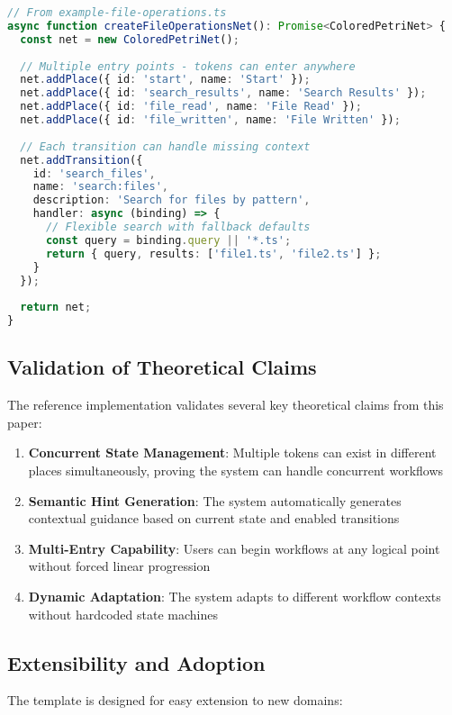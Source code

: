 \documentclass[11pt,a4paper]{article}
\begin{document}
\begin{lstlisting}[language=TypeScript]
// From example-file-operations.ts
async function createFileOperationsNet(): Promise<ColoredPetriNet> {
  const net = new ColoredPetriNet();
  
  // Multiple entry points - tokens can enter anywhere
  net.addPlace({ id: 'start', name: 'Start' });
  net.addPlace({ id: 'search_results', name: 'Search Results' });
  net.addPlace({ id: 'file_read', name: 'File Read' });
  net.addPlace({ id: 'file_written', name: 'File Written' });
  
  // Each transition can handle missing context
  net.addTransition({
    id: 'search_files',
    name: 'search:files',
    description: 'Search for files by pattern',
    handler: async (binding) => {
      // Flexible search with fallback defaults
      const query = binding.query || '*.ts';
      return { query, results: ['file1.ts', 'file2.ts'] };
    }
  });
  
  return net;
}
\end{lstlisting}

\subsection{Validation of Theoretical Claims}

The reference implementation validates several key theoretical claims from this paper:

\begin{enumerate}
\item \textbf{Concurrent State Management}: Multiple tokens can exist in different places simultaneously, proving the system can handle concurrent workflows
\item \textbf{Semantic Hint Generation}: The system automatically generates contextual guidance based on current state and enabled transitions
\item \textbf{Multi-Entry Capability}: Users can begin workflows at any logical point without forced linear progression
\item \textbf{Dynamic Adaptation}: The system adapts to different workflow contexts without hardcoded state machines
\end{enumerate}

\subsection{Extensibility and Adoption}

The template is designed for easy extension to new domains:
\end{document}
